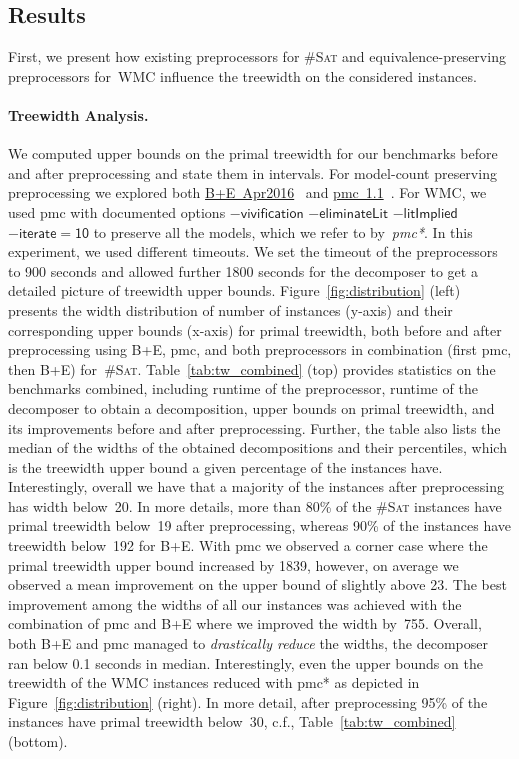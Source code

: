 \documentclass{llncs}
\newcommand{\cSAT}{\textsc{\#Sat}\xspace}%
\newcommand{\WMC}{\textsc{WMC}\xspace}%
\newcommand{\ops}[1]{\ensuremath{\mathsf{#1}}}
\begin{document}
\subsection{Results}
First, we present how existing preprocessors for \cSAT and
equivalence-preserving preprocessors for~\WMC influence the treewidth
on the considered instances.






\paragraph{Treewidth Analysis.}
We computed upper bounds on the primal %
treewidth for our benchmarks before and after preprocessing and state
them in intervals.
%
For model-count preserving preprocessing we
explored both
\href{http://www.cril.univ-artois.fr/kc/bpe2.html}{B+E~Apr2016}~\cite{LagniezLoncaMarquis16a}
and
\href{http://www.cril.univ-artois.fr/kc/pmc.html}{pmc~1.1}~\cite{LagniezMarquis14a}.
%
For \WMC, we used pmc with documented options \ops{-vivification}
\ops{-eliminateLit} \ops{-litImplied} \ops{-iterate=10} to preserve
all the models, which we refer to by~\emph{pmc*}.
%
%
In this experiment, we used different timeouts. We set the timeout of
the preprocessors to 900 seconds and allowed further 1800 seconds for
the decomposer to get a detailed picture of treewidth upper bounds.
%
Figure~\ref{fig:distribution} (left) presents the width distribution
of number of instances (y-axis) and their corresponding upper bounds
(x-axis) for primal treewidth, both before and after preprocessing
using B+E, pmc, and both preprocessors in combination (first pmc, then
B+E) for~\cSAT.
%
Table~\ref{tab:tw_combined} (top) provides statistics on the
benchmarks combined, including runtime of the preprocessor, runtime of
the decomposer to obtain a decomposition, upper bounds on primal
treewidth, and its improvements before and after
preprocessing. 
%
Further, the table also lists the median of the widths of the obtained
decompositions and their percentiles, which is the treewidth upper
bound a given percentage of the instances have.
%
%
%
Interestingly, overall we have that a majority of the instances
after preprocessing has width below~20.
%
In more details, more than 80\% of the \cSAT instances have primal 
treewidth below~19
after preprocessing, whereas 90\% of the instances have
treewidth below~192 for B+E.
%
With pmc we observed a corner case where the primal treewidth upper
bound increased by 1839, however, on average we observed a mean
improvement on the upper bound of slightly above 23. %
The best improvement among the widths of all our instances was
achieved with the combination of pmc and B+E where we improved the
width by~755.
%
Overall, both B+E and pmc managed to \emph{drastically reduce} the
widths, the decomposer ran below 0.1 seconds in median.
%
Interestingly, even the upper bounds on the treewidth of the \WMC
instances reduced with pmc* as depicted in
Figure~\ref{fig:distribution} (right).  In more detail, after
preprocessing 95\% of the instances have primal treewidth below~30,
c.f., Table~\ref{tab:tw_combined} (bottom).
%
\end{document}
